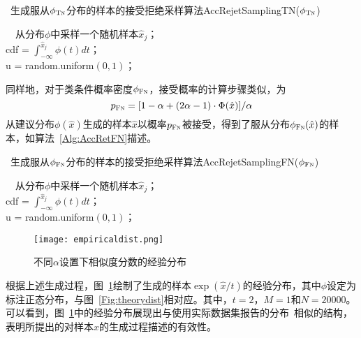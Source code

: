 \begin{algorithm}[!]
	\caption{~生成服从$\phi_{\textsc{Tn}}$分布的样本的接受拒绝采样算法AccRejetSamplingTN($\phi_{\textsc{Tn}}$)}\label{Alg:AccRetTN}
	\BlankLine
	~~从分布$\phi$中采样一个随机样本$\hat{x}_j$；\\
	cdf = $\int_{-\infty}^{\hat{x}_j} \phi(t)dt$； \\
	u = random.uniform$(0,1)$； \\
\end{algorithm}

同样地，对于类条件概率密度$\phi_{\textsc{Fn}}$，接受概率的计算步骤类似，为
\[p_{\textsc{Fn}} = [1 - \alpha + (2 \alpha - 1)\cdot \Phi(\hat{x})] / \alpha \]
从建议分布$\phi(\hat{x})$生成的样本$\hat{x}$以概率$p_{\textsc{Fn}}$被接受，得到了服从分布$ \phi_{\textsc{Fn}}(\hat{x})$的样本，如算法~\ref{Alg:AccRetFN}描述。
\begin{algorithm}[!]
	\caption{~生成服从$\phi_{\textsc{Fn}}$分布的样本的接受拒绝采样算法AccRejetSamplingFN($\phi_{\textsc{Fn}}$)}\label{Alg:AccRetFN}
	\BlankLine
	~~从分布$\phi$中采样一个随机样本$\hat{x}_j$；\\
	cdf = $\int_{-\infty}^{\hat{x}_j} \phi(t)dt$； \\
	u = random.uniform$(0,1)$； \\
	
\end{algorithm}
\begin{figure}[!]
	\centering
	\texttt{[image: empiricaldist.png]}
	\caption{不同$\alpha$设置下相似度分数的经验分布}
	\label{Fig:empiricaldist}
\end{figure}
\par
根据上述生成过程，图~\ref{Fig:empiricaldist}绘制了生成的样本$\exp(\hat{x}/t)$的经验分布，其中$\phi$设定为标注正态分布，与图~\ref{Fig:theorydist}相对应。其中，$t=2$，$M=1$和$N=20000$。可以看到，图~\ref{Fig:empiricaldist}中的经验分布展现出与使用实际数据集报告的分布~\cite{Robinson:2021:ICLR, Xia:2022:ICML}相似的结构，表明所提出的对样本$\hat{x}$的生成过程描述的有效性。

